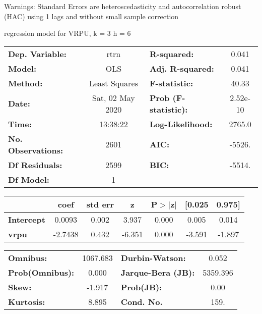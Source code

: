 Warnings: \newline
 [1] Standard Errors are heteroscedasticity and autocorrelation robust (HAC) using 1 lags and without small sample correction\ 

regression model for VRPU, k = 3 h = 6\begin{center}
\begin{tabular}{lclc}
\toprule
\textbf{Dep. Variable:}    &       rtrn       & \textbf{  R-squared:         } &     0.041   \\
\textbf{Model:}            &       OLS        & \textbf{  Adj. R-squared:    } &     0.041   \\
\textbf{Method:}           &  Least Squares   & \textbf{  F-statistic:       } &     40.33   \\
\textbf{Date:}             & Sat, 02 May 2020 & \textbf{  Prob (F-statistic):} &  2.52e-10   \\
\textbf{Time:}             &     13:38:22     & \textbf{  Log-Likelihood:    } &    2765.0   \\
\textbf{No. Observations:} &        2601      & \textbf{  AIC:               } &    -5526.   \\
\textbf{Df Residuals:}     &        2599      & \textbf{  BIC:               } &    -5514.   \\
\textbf{Df Model:}         &           1      & \textbf{                     } &             \\
\bottomrule
\end{tabular}
\begin{tabular}{lcccccc}
                   & \textbf{coef} & \textbf{std err} & \textbf{z} & \textbf{P$> |$z$|$} & \textbf{[0.025} & \textbf{0.975]}  \\
\midrule
\textbf{Intercept} &       0.0093  &        0.002     &     3.937  &         0.000        &        0.005    &        0.014     \\
\textbf{vrpu}      &      -2.7438  &        0.432     &    -6.351  &         0.000        &       -3.591    &       -1.897     \\
\bottomrule
\end{tabular}
\begin{tabular}{lclc}
\textbf{Omnibus:}       & 1067.683 & \textbf{  Durbin-Watson:     } &    0.052  \\
\textbf{Prob(Omnibus):} &   0.000  & \textbf{  Jarque-Bera (JB):  } & 5359.396  \\
\textbf{Skew:}          &  -1.917  & \textbf{  Prob(JB):          } &     0.00  \\
\textbf{Kurtosis:}      &   8.895  & \textbf{  Cond. No.          } &     159.  \\
\bottomrule
\end{tabular}
\end{center}

